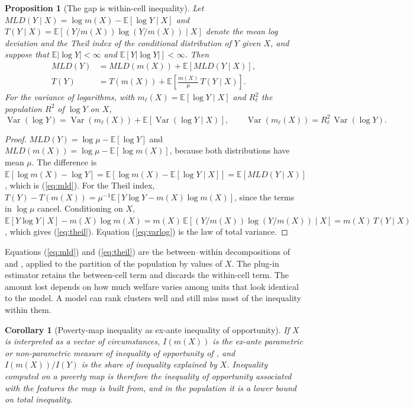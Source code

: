\documentclass[pdflatex,sn-mathphys-ay]{sn-jnl}
\theoremstyle{thmstyleone}%
\newtheorem{proposition}{Proposition}%
\newtheorem{corollary}{Corollary}%
\theoremstyle{thmstyletwo}%
\theoremstyle{thmstylethree}%
\newcommand{\E}{\mathbb{E}}
\newcommand{\Var}{\operatorname{Var}}
\begin{document}
\begin{proposition}[The gap is within-cell inequality]\label{prop:decomp}
Let $MLD(Y\mid X)=\log m(X)-\E[\log Y\mid X]$ and $T(Y\mid X)=\E[(Y/m(X))\log(Y/m(X))\mid X]$ denote the mean log deviation and the Theil index of the conditional distribution of $Y$ given $X$, and suppose that $\E|\log Y|<\infty$ and $\E[Y|\log Y|]<\infty$. Then
\begin{align}
MLD(Y) &= MLD(m(X)) + \E\left[MLD(Y\mid X)\right], \label{eq:mld}\\
T(Y) &= T(m(X)) + \E\left[\frac{m(X)}{\mu}\,T(Y\mid X)\right]. \label{eq:theil}
\end{align}
For the variance of logarithms, with $m_\ell(X)=\E[\log Y\mid X]$ and $R^2_\ell$ the population $R^2$ of $\log Y$ on $X$,
\begin{equation}
\Var(\log Y)=\Var(m_\ell(X))+\E[\Var(\log Y\mid X)], \qquad \Var(m_\ell(X))=R^2_\ell\,\Var(\log Y). \label{eq:varlog}
\end{equation}
\end{proposition}

\begin{proof}
$MLD(Y)=\log\mu-\E[\log Y]$ and $MLD(m(X))=\log\mu-\E[\log m(X)]$, because both distributions have mean $\mu$. The difference is $\E[\log m(X)-\log Y]=\E[\log m(X)-\E[\log Y\mid X]]=\E[MLD(Y\mid X)]$, which is (\ref{eq:mld}). For the Theil index, $T(Y)-T(m(X))=\mu^{-1}\E[Y\log Y-m(X)\log m(X)]$, since the terms in $\log\mu$ cancel. Conditioning on $X$, $\E[Y\log Y\mid X]-m(X)\log m(X)=m(X)\,\E[(Y/m(X))\log(Y/m(X))\mid X]=m(X)\,T(Y\mid X)$, which gives (\ref{eq:theil}). Equation (\ref{eq:varlog}) is the law of total variance.
\end{proof}

Equations (\ref{eq:mld}) and (\ref{eq:theil}) are the between--within decompositions of \citet{bourguignon1979} and \citet{shorrocks1980}, applied to the partition of the population by values of $X$. The plug-in estimator retains the between-cell term and discards the within-cell term. The amount lost depends on how much welfare varies among units that look identical to the model. A model can rank clusters well and still miss most of the inequality within them.

\begin{corollary}[Poverty-map inequality as ex-ante inequality of opportunity]\label{cor:iop}
If $X$ is interpreted as a vector of circumstances, $I(m(X))$ is the ex-ante parametric or non-parametric measure of inequality of opportunity of \citet{ferreira2011}, and $I(m(X))/I(Y)$ is the share of inequality explained by $X$. Inequality computed on a poverty map is therefore the inequality of opportunity associated with the features the map is built from, and in the population it is a lower bound on total inequality.
\end{corollary}
\end{document}

